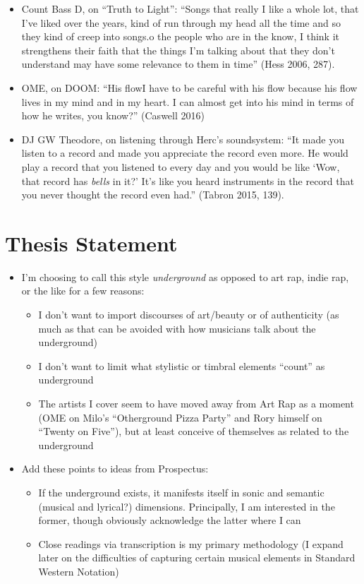 \begin{itemize}
    \item Count Bass D, on ``Truth to Light'': ``Songs that really I like a whole lot, that I've liked over 
    the years, kind of run through my head all the time and so they kind of creep into songs.\textellipsis 
    [T]o the people who are in the know, I think it strengthens their faith that the things I'm talking about
    that they don't understand may have some relevance to them in time'' (Hess 2006, 287).
    \item OME, on DOOM: ``His flow\textemdash I have to be careful with his flow because his flow lives in 
    my mind and in my heart. I can almost get into his mind in terms of how he writes, you know?'' 
    (Caswell 2016)
    \item DJ GW Theodore, on listening through Herc's soundsystem: ``It made you listen to a record and made
    you appreciate the record even more. He would play a record that you listened to every day and you would
    be like `Wow, that record has \emph{bells} in it?' It's like you heard instruments in the record that you
    never thought the record even had.'' (Tabron 2015, 139).
\end{itemize}

\section{Thesis Statement}

\begin{itemize}
    \item I'm choosing to call this style \emph{underground} as opposed to art rap, indie rap, or the like
    for a few reasons:
        \begin{itemize}
            \item I don't want to import discourses of art/beauty or of authenticity (as much as that can 
            be avoided with how musicians talk about the underground)
            \item I don't want to limit what stylistic or timbral elements ``count'' as underground
            \item The artists I cover seem to have moved away from Art Rap as a moment (OME on Milo's
            ``Otherground Pizza Party'' and Rory himself on ``Twenty on Five''), but at least conceive of
            themselves as related to the underground 
        \end{itemize}
    \item Add these points to ideas from Prospectus:
        \begin{itemize}
            \item If the underground exists, it manifests itself in sonic and semantic (musical and lyrical?)
            dimensions. Principally, I am interested in the former, though obviously acknowledge the latter
            where I can
            \item Close readings via transcription is my primary methodology (I expand later on the
            difficulties of capturing certain musical elements in Standard Western Notation)
        \end{itemize}
\end{itemize}

